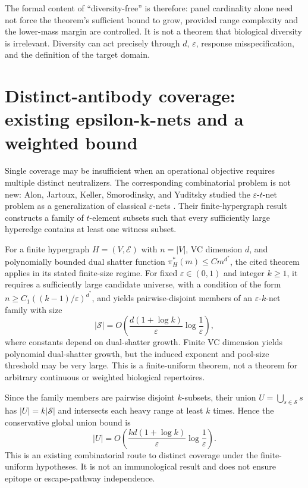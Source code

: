 \documentclass[11pt,a4paper]{article}
\newcommand{\eps}{\varepsilon}
\begin{document}
The formal content of “diversity-free” is therefore: panel cardinality alone need not force the theorem's sufficient bound to grow, provided range complexity and the lower-mass margin are controlled. It is not a theorem that biological diversity is irrelevant. Diversity can act precisely through $d$, $\eps$, response misspecification, and the definition of the target domain.

\section{Distinct-antibody coverage: existing epsilon-k-nets and a weighted bound}
Single coverage may be insufficient when an operational objective requires multiple distinct neutralizers. The corresponding combinatorial problem is not new: Alon, Jartoux, Keller, Smorodinsky, and Yuditsky studied the $\eps$-$t$-net problem as a generalization of classical $\eps$-nets \citep{AlonEtAl2022}. Their finite-hypergraph result constructs a family of $t$-element subsets such that every sufficiently large hyperedge contains at least one witness subset.

For a finite hypergraph $H=(V,\mathcal E)$ with $n=|V|$, VC dimension $d$, and polynomially bounded dual shatter function $\pi_H^*(m)\leq C m^{d^*}$, the cited theorem applies in its stated finite-size regime. For fixed $\eps\in(0,1)$ and integer $k\geq1$, it requires a sufficiently large candidate universe, with a condition of the form $n\geq C_1((k-1)/\eps)^{d^*}$, and yields pairwise-disjoint members of an $\eps$-$k$-net family with size
\begin{equation}|\mathcal S|=O\!\left(\frac{d(1+\log k)}{\eps}\log\frac{1}{\eps}\right),\label{eq:tknet}\end{equation}
where constants depend on dual-shatter growth. Finite VC dimension yields polynomial dual-shatter growth, but the induced exponent and pool-size threshold may be very large. This is a finite-uniform theorem, not a theorem for arbitrary continuous or weighted biological repertoires.

Since the family members are pairwise disjoint $k$-subsets, their union $U=\bigcup_{s\in\mathcal S}s$ has $|U|=k|\mathcal S|$ and intersects each heavy range at least $k$ times. Hence the conservative global union bound is
\begin{equation}|U|=O\!\left(\frac{k d(1+\log k)}{\eps}\log\frac{1}{\eps}\right).\label{eq:globalk}\end{equation}
This is an existing combinatorial route to distinct coverage under the finite-uniform hypotheses. It is not an immunological result and does not ensure epitope or escape-pathway independence.
\end{document}
